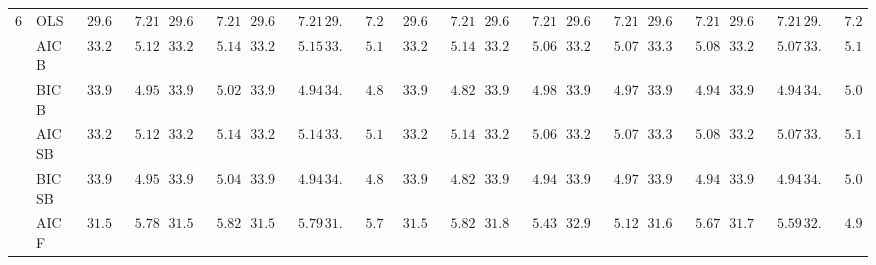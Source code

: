 \documentclass{article}
\begin{document}
\begin{tabular}{ll|ll|llllll|llllll|llllll}
6 & OLS  & $\phantom{0}29.67$ & $\phantom{00}7.21$ & $\phantom{0}29.67$ & $\phantom{00}7.21$ & $\phantom{0}29.67$ & $\phantom{00}7.21$ & $29.67$ & $\phantom{0}7.21$ & $\phantom{0}29.67$ & $\phantom{00}7.21$ & $\phantom{0}29.67$ & $\phantom{00}7.21$ & $\phantom{0}29.67$ & $\phantom{00}7.21$ & $\phantom{0}29.67$ & $\phantom{00}7.21$ & $\phantom{0}29.67$ & $\phantom{00}7.21$ & $29.67$ & $\phantom{0}7.21$ \\
 & AIC B  & $\phantom{0}33.24$ & $\phantom{00}5.12$ & $\phantom{0}33.28$ & $\phantom{00}5.14$ & $\phantom{0}33.29$ & $\phantom{00}5.15$ & $33.32$ & $\phantom{0}5.11$ & $\phantom{0}33.27$ & $\phantom{00}5.14$ & $\phantom{0}33.27$ & $\phantom{00}5.06$ & $\phantom{0}33.28$ & $\phantom{00}5.07$ & $\phantom{0}33.30$ & $\phantom{00}5.08$ & $\phantom{0}33.26$ & $\phantom{00}5.07$ & $33.26$ & $\phantom{0}5.14$ \\
 & BIC B  & $\phantom{0}33.97$ & $\phantom{00}4.95$ & $\phantom{0}33.94$ & $\phantom{00}5.02$ & $\phantom{0}33.90$ & $\phantom{00}4.94$ & $34.12$ & $\phantom{0}4.88$ & $\phantom{0}33.96$ & $\phantom{00}4.82$ & $\phantom{0}33.96$ & $\phantom{00}4.98$ & $\phantom{0}33.96$ & $\phantom{00}4.97$ & $\phantom{0}33.92$ & $\phantom{00}4.94$ & $\phantom{0}33.91$ & $\phantom{00}4.94$ & $34.11$ & $\phantom{0}5.02$ \\
 & AIC SB  & $\phantom{0}33.24$ & $\phantom{00}5.12$ & $\phantom{0}33.28$ & $\phantom{00}5.14$ & $\phantom{0}33.29$ & $\phantom{00}5.14$ & $33.32$ & $\phantom{0}5.11$ & $\phantom{0}33.27$ & $\phantom{00}5.14$ & $\phantom{0}33.27$ & $\phantom{00}5.06$ & $\phantom{0}33.27$ & $\phantom{00}5.07$ & $\phantom{0}33.30$ & $\phantom{00}5.08$ & $\phantom{0}33.24$ & $\phantom{00}5.07$ & $33.26$ & $\phantom{0}5.14$ \\
 & BIC SB  & $\phantom{0}33.97$ & $\phantom{00}4.95$ & $\phantom{0}33.94$ & $\phantom{00}5.04$ & $\phantom{0}33.90$ & $\phantom{00}4.94$ & $34.12$ & $\phantom{0}4.88$ & $\phantom{0}33.96$ & $\phantom{00}4.82$ & $\phantom{0}33.94$ & $\phantom{00}4.94$ & $\phantom{0}33.96$ & $\phantom{00}4.97$ & $\phantom{0}33.92$ & $\phantom{00}4.94$ & $\phantom{0}33.91$ & $\phantom{00}4.94$ & $34.10$ & $\phantom{0}5.01$ \\
 & AIC F  & $\phantom{0}31.51$ & $\phantom{00}5.78$ & $\phantom{0}31.52$ & $\phantom{00}5.82$ & $\phantom{0}31.54$ & $\phantom{00}5.79$ & $31.61$ & $\phantom{0}5.73$ & $\phantom{0}31.52$ & $\phantom{00}5.82$ & $\phantom{0}31.88$ & $\phantom{00}5.43$ & $\phantom{0}32.97$ & $\phantom{00}5.12$ & $\phantom{0}31.63$ & $\phantom{00}5.67$ & $\phantom{0}31.76$ & $\phantom{00}5.59$ & $32.83$ & $\phantom{0}4.94$ \\

\end{tabular}
\end{document}
